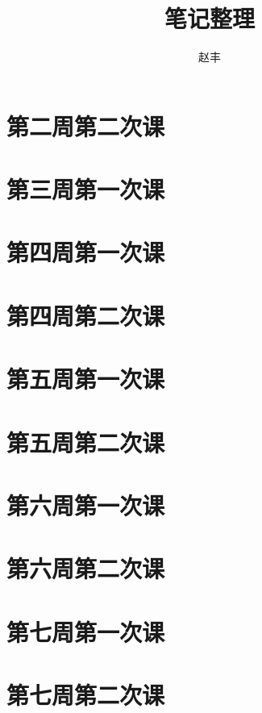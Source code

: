 \documentclass{article}
\numberwithin{equation}{section}
\begin{document}
\title{笔记整理}
\author{赵丰}
\maketitle
\tableofcontents
\section{第二周第二次课}

\section{第三周第一次课}

\section{第四周第一次课}

\section{第四周第二次课}

\section{第五周第一次课}

\section{第五周第二次课}

\section{第六周第一次课}

\section{第六周第二次课}

\section{第七周第一次课}

\section{第七周第二次课}

\end{document}
